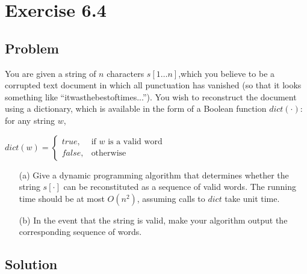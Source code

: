 \documentclass[12pt, letterpaper]{article}
\begin{document}
\section{Exercise 6.4}

\subsection{Problem}

You are given a string of \(n\) characters \(s[1 \dots n]\),which you believe to be a corrupted text document in which all punctuation has vanished (so that it looks something like “itwasthebestoftimes...”). You wish to reconstruct the document using a dictionary, which is available in the form of a Boolean function \(dict(\cdot)\): for any string \(w\),
\begin{center}
    \(
        dict(w) = 
        \begin{cases}
            true,& \text{if } w \text{ is a valid word} \\
            false,& \text{otherwise}
        \end{cases}
    \)
\end{center}

\begin{itemize}
    \item[(a)] Give a dynamic programming algorithm that determines whether the string \(s[\cdot]\) can be reconstituted as a sequence of valid words. The running time should be at most \(O(n^2)\), assuming calls to \(dict\) take unit time.
    \item[(b)] In the event that the string is valid, make your algorithm output the corresponding sequence of words.
\end{itemize}

\subsection{Solution}

\end{document}
